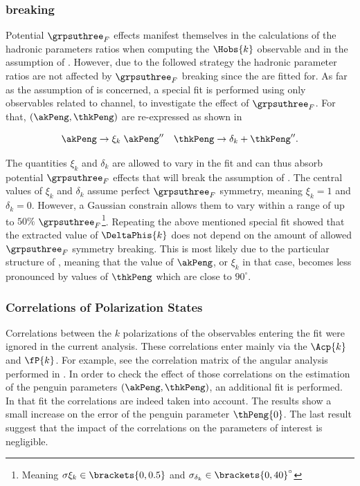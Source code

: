 \subsubsection{\grpsuthree breaking}
\label{su3_breaking}
Potential $\grpsuthree_F$ effects manifest themselves in the calculations of the hadronic parameters ratios
when computing the $\Hobs{k}$ observable and in the assumption of . However, due to the
followed strategy the hadronic parameter ratios are not affected by $\grpsuthree_F$ breaking since the are fitted for.
As far as the assumption of  is concerned, a special fit is performed using only observables
related to \BdJpsiRho channel, to investigate the effect of $\grpsuthree_F$. For that, $(\akPeng,\thkPeng)$
are re-expressed as shown in 

\begin{equation}
  \akPeng \to \xi_k \; \akPeng'' \quad \thkPeng \to \delta_k + \thkPeng''.
\label{su3_breaking}
\end{equation}

\noindent The quantities $\xi_k$ and $\delta_k$ are allowed to vary in the fit and can thus absorb
potential $\grpsuthree_F$ effects that will break the assumption of .
The central values of $\xi_k$ and $\delta_k$ assume perfect $\grpsuthree_F$ symmetry, meaning $\xi_k=1$ and $\delta_k=0$.
However, a Gaussian constrain allows them to vary within a range of up to $50\%$
$\grpsuthree_F$\footnote{Meaning $\sigma{\xi_k}\in\brackets{0,0.5}$ and $\sigma_{\delta_k}\in\brackets{0,40}^\circ$ }.
Repeating the above mentioned special fit showed that the extracted value of $\DeltaPhis{k}$
does not depend on the amount of allowed $\grpsuthree_F$ symmetry breaking.
This is most likely due to the particular structure of , meaning that
the value of $\akPeng$, or $\xi_k$ in that case, becomes less pronounced by values of
$\thkPeng$ which are close to $90^\circ$.

\subsubsection{Correlations of Polarization States}
Correlations between the $k$ polarizations of the observables entering the \chisq fit were ignored in the
current analysis. These correlations enter mainly via the $\Acp{k}$ and $\fP{k}$. For example, see the
correlation matrix  of the angular analysis performed in .
In order to check the effect of those correlations on the estimation of the penguin parameters $(\akPeng,\thkPeng)$,
an additional \chisq fit is performed. In that fit the correlations are indeed taken into account.
The results show a small increase on the error of the penguin parameter $\thPeng{0}$.
The last result suggest that the impact of the correlations on the parameters of interest is negligible.

